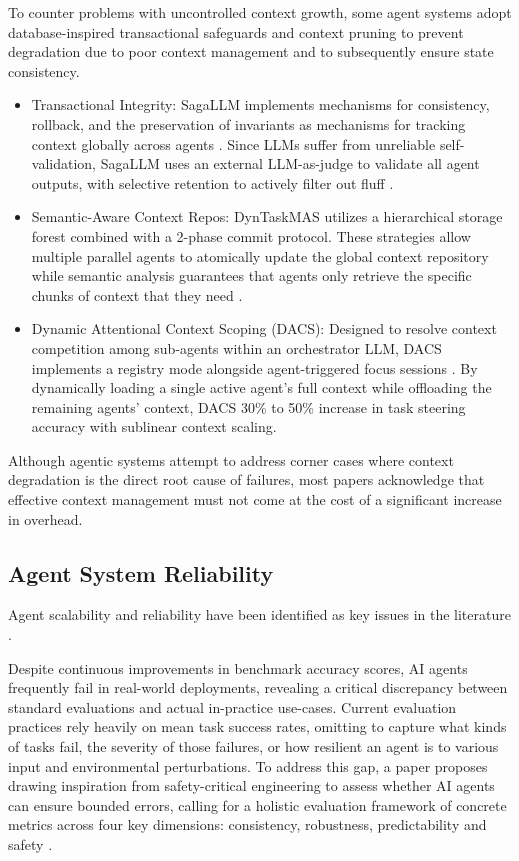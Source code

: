 \documentclass[conference]{IEEEtran}
\begin{document}
To counter problems with uncontrolled context growth, some agent systems adopt
database-inspired transactional safeguards and context pruning to prevent degradation due to poor context
management and to subsequently ensure state consistency.
\begin{itemize}
\item Transactional Integrity: SagaLLM implements mechanisms for consistency, 
	rollback, and the preservation of invariants as mechanisms for tracking context globally
	across agents \cite{chang_sagallm_2025}. 
	Since LLMs suffer from unreliable self-validation, SagaLLM uses an external
	LLM-as-judge to validate all agent outputs,
	with selective retention to actively filter out fluff \cite{chang_sagallm_2025}.
\item Semantic-Aware Context Repos: DynTaskMAS utilizes a hierarchical storage forest combined 
	with a 2-phase commit protocol. 
	These strategies allow multiple parallel agents to atomically update the global context repository 
	while semantic analysis guarantees that agents only retrieve the specific chunks 
	of context that they need \cite{yu_dyntaskmas_2025}.
\item Dynamic Attentional Context Scoping (DACS): Designed to resolve context competition among
	sub-agents within an orchestrator LLM, DACS implements a registry mode alongside agent-triggered
	focus sessions \cite{patel_dynamic_2026}. 
	By dynamically loading a single active agent's full context while offloading the remaining
	agents' context, DACS 30\% to 50\% increase in task steering accuracy with sublinear context scaling.
\end{itemize}
Although agentic systems attempt to address corner cases where context degradation is the
direct root cause of failures, most papers acknowledge that effective context management must not
come at the cost of a significant increase in overhead.

\subsection{Agent System Reliability}
Agent scalability and reliability have been identified as key issues in the literature
\cite{kim_towards_2026, rabanser_towards_2026}.

Despite continuous improvements in benchmark accuracy scores, 
AI agents frequently fail in real-world deployments, revealing a critical discrepancy 
between standard evaluations and actual in-practice use-cases. 
Current evaluation practices rely heavily on mean task success rates, omitting to 
capture what kinds of tasks fail, the severity of those failures, or how resilient an 
agent is to various input and environmental perturbations. 
To address this gap, a paper proposes drawing inspiration from safety-critical engineering to 
assess whether AI agents can ensure bounded errors, calling for a holistic
evaluation framework of concrete metrics across four key dimensions: 
consistency, robustness, predictability and safety \cite{rabanser_towards_2026}.
\end{document}
